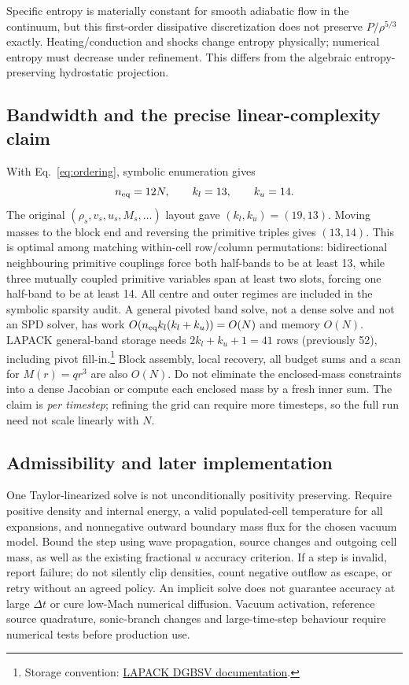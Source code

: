 \documentclass[11pt]{article}
\begin{document}
Specific entropy is materially constant for smooth adiabatic flow in
the continuum, but this first-order dissipative discretization does not
preserve $P/\rho^{5/3}$ exactly. Heating/conduction and shocks change
entropy physically; numerical entropy must decrease under refinement.
This differs from the algebraic entropy-preserving hydrostatic projection.

\subsection{Bandwidth and the precise linear-complexity claim}
With Eq.~\eqref{eq:ordering}, symbolic enumeration gives
\begin{equation}
 n_{\rm eq}=12N,\qquad k_l=13,\qquad k_u=14.
\end{equation}
The original $(\rho_s,v_s,u_s,M_s,\ldots)$ layout gave $(k_l,k_u)=(19,13)$.
Moving masses to the block end and reversing the primitive triples gives
$(13,14)$. This is optimal among matching within-cell row/column
permutations: bidirectional neighbouring primitive couplings force
both half-bands to be at least 13, while three mutually coupled primitive
variables span at least two slots, forcing one half-band to be at least 14.
All centre and outer regimes are included in the symbolic sparsity audit.
A general pivoted band solve, not a dense solve and not an SPD solver,
has work $O(n_{\rm eq}k_l(k_l+k_u))=O(N)$ and memory $O(N)$.
LAPACK general-band storage needs $2k_l+k_u+1=41$ rows (previously 52), including pivot
fill-in.\footnote{Storage convention:
\href{https://netlib.org/lapack/explore-html/db/df8/group__gbsv_gaff55317eb3aed2278a85919a488fec07.html}{LAPACK DGBSV documentation}.}
Block assembly, local recovery, all budget sums and a scan for
$M(r)=qr^3$ are also $O(N)$. Do not eliminate the enclosed-mass constraints
into a dense Jacobian or compute each enclosed mass by a fresh inner sum.
The claim is \emph{per timestep}; refining the grid can require more
timesteps, so the full run need not scale linearly with $N$.

\subsection{Admissibility and later implementation}
One Taylor-linearized solve is not unconditionally positivity preserving.
Require positive density and internal energy, a valid populated-cell
temperature for all expansions, and nonnegative outward boundary mass
flux for the chosen vacuum model. Bound the step using wave propagation,
source changes and outgoing cell mass, as well as the existing fractional
$u$ accuracy criterion. If a step is invalid, report failure; do not
silently clip densities, count negative outflow as escape, or retry without
an agreed policy. An implicit solve does not guarantee accuracy at large
$\Delta t$ or cure low-Mach numerical diffusion. Vacuum activation,
reference source quadrature, sonic-branch changes and large-time-step
behaviour require numerical tests before production use.
\end{document}
